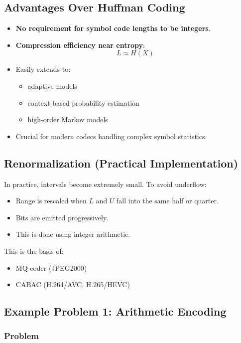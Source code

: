 \documentclass{AnantDocumentation}
\begin{document}
\subsection{Advantages Over Huffman Coding}

\begin{itemize}
\item \textbf{No requirement for symbol code lengths to be integers}.
\item \textbf{Compression efficiency near entropy}:
\[
L \approx H(X)
\]
\item Easily extends to:
	\begin{itemize}
	\item adaptive models
	\item context-based probability estimation
	\item high-order Markov models
	\end{itemize}
\item Crucial for modern codecs handling complex symbol statistics.
\end{itemize}

\subsection{Renormalization (Practical Implementation)}

In practice, intervals become extremely small.  
To avoid underflow:

\begin{itemize}
\item Range is rescaled when \(L\) and \(U\) fall into the same half or quarter.
\item Bits are emitted progressively.
\item This is done using integer arithmetic.
\end{itemize}

This is the basis of:
\begin{itemize}
\item MQ-coder (JPEG2000)
\item CABAC (H.264/AVC, H.265/HEVC)
\end{itemize}

\subsection{Example Problem 1: Arithmetic Encoding}

\subsubsection*{Problem}
\end{document}
